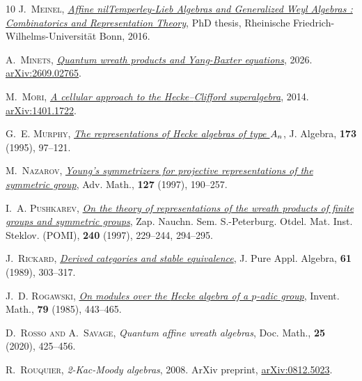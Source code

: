 \documentclass[a4paper,11pt]{amsart}
\numberwithin{equation}{subsection}
\theoremstyle{definition}
\theoremstyle{theorem}
\theoremstyle{remark}
\begin{document}
\begin{thebibliography}{10}
\textsc{J.~Meinel}, \href{bonndoc:
  https://nbn-resolving.org/urn:nbn:de:hbz:5n-44522}{\textit{Affine
  nilTemperley-Lieb Algebras and Generalized Weyl Algebras : Combinatorics and
  Representation Theory}}, PhD thesis, Rheinische
  Friedrich-Wilhelms-Universit\"at Bonn, 2016.

\textsc{A.~Minets}, \href{https://arxiv.org/abs/2609.02765}{\textit{Quantum
  wreath products and Yang-Baxter equations}}, 2026.
\newblock \href{http://arxiv.org/abs/2609.02765}{arXiv:2609.02765}.

\textsc{M.~Mori}, \href{http://arxiv.org/abs/1401.1722}{\textit{A cellular
  approach to the {H}ecke--{C}lifford superalgebra}}, 2014.
\newblock \href{http://arxiv.org/abs/1401.1722}{arXiv:1401.1722}.

\textsc{G.~E. Murphy},
  \href{http://dx.doi.org/10.1006/jabr.1995.1079}{\textit{The representations
  of {H}ecke algebras of type {$A\sb n$}}}, J. Algebra, \textbf{173} (1995),
  97--121.

\textsc{M.~Nazarov},
  \href{http://dx.doi.org/10.1006/aima.1997.1621}{\textit{Young's symmetrizers
  for projective representations of the symmetric group}}, Adv. Math.,
  \textbf{127} (1997), 190--257.

\textsc{I.~A. Pushkarev},
  \href{http://dx.doi.org/10.1007/BF02175835}{\textit{On the theory of
  representations of the wreath products of finite groups and symmetric
  groups}}, Zap. Nauchn. Sem. S.-Peterburg. Otdel. Mat. Inst. Steklov. (POMI),
  \textbf{240} (1997), 229--244, 294--295.

\textsc{J.~Rickard},
  \href{http://dx.doi.org/10.1016/0022-4049(89)90081-9}{\textit{Derived
  categories and stable equivalence}}, J. Pure Appl. Algebra, \textbf{61}
  (1989), 303--317.

\textsc{J.~D. Rogawski}, \href{http://dx.doi.org/10.1007/BF01388516}{\textit{On
  modules over the {H}ecke algebra of a $p$-adic group}}, Invent. Math.,
  \textbf{79} (1985), 443--465.

\textsc{D.~Rosso and A.~Savage}, \textit{Quantum affine wreath algebras}, Doc.
  Math., \textbf{25} (2020), 425--456.

\textsc{R.~Rouquier}, \textit{2-{Kac-Moody} algebras}, 2008.
\newblock ArXiv preprint,
  \href{http://arxiv.org/abs/0812.5023}{arXiv:0812.5023}.


\end{thebibliography}
\end{document}
